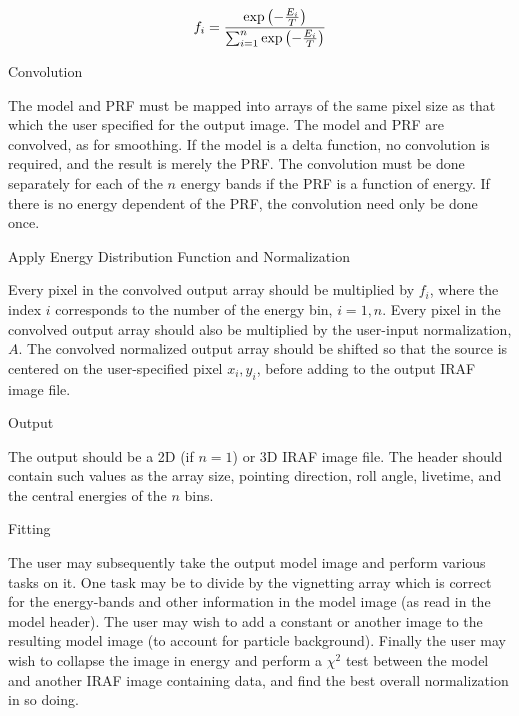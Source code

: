 $$f_i = {\exp \left( - {E_i \over T }\right) 
\over \sum_{i=1}^n \exp \left( - {E_i \over T }\right)} $$

\@{Convolution}

The model and PRF must be mapped into arrays of the same pixel size as
that which the user specified for the output image.
The model and PRF are convolved, as for smoothing.  If the model is a
delta function, no convolution is required, and the result is merely
the PRF.  The convolution must be done separately for each of the $n$
energy bands if the PRF is a function of energy.  If there is no energy
dependent of the PRF, the convolution need only be done once.

\@{Apply Energy Distribution Function and Normalization}

Every pixel in the convolved output array should be multiplied by $f_i$,
where the index $i$ corresponds to the number of the energy bin, $i =
1, n$.    Every pixel in the convolved output array should also be
multiplied by the user-input normalization, $A$.  The convolved
normalized output array should be shifted so that the source is
centered on the user-specified pixel $x_i, y_i$, before adding to
the output IRAF image file.

\@{Output}

The output should be a 2D (if $n = 1$) or 3D IRAF image file.  The header should
contain
such values as the array size, pointing direction, roll angle,
livetime, and the central energies of the $n$ bins.

\@{Fitting}

The user may subsequently take the output model image and perform various tasks on
it.
One task may be to divide by the vignetting array which is correct for
the energy-bands and other information in the model image (as read in
the model header).  The user may wish to add a constant
or another image to the resulting model image (to account for particle
background).  Finally the user may wish to collapse the image in
energy and perform a $\chi^2$ test
between the model and another IRAF image containing data, and find the
best overall normalization in so doing.

 
\vfill\eject






